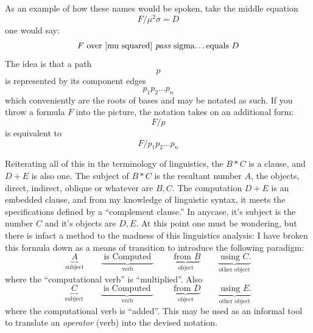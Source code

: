 \documentclass[twoside]{article}
\begin{document}
As an example of how these names would be spoken, take the middle equation
$$ F/\mu^{2}\sigma = D $$
one would say:
$$ F \mbox{ over [mu squared] \emph{pass} sigma\ldots equals } D $$
The idea is that a path
$$ p $$ is represented by its component edges
$$ p_1p_2\ldots p_n $$
which conveniently are the roots of bases and may be notated as such.
If you throw a formula $ F $ into the picture, the notation takes on an additional form:
$$ F/p $$
is equivalent to
$$ F/p_1p_2\ldots p_n $$

Reiterating all of this in the terminology of linguistics, the $ B*C $ is a clause, and $ D+E $ is also one.
The subject of $ B*C $ is the resultant number $ A $, the objects, direct, indirect, oblique or whatever are $ B, C $.
The computation $ D+E $ is an embedded clause, and from my knowledge of linguistic syntax, it meets the specifications
defined by a ``complement clause.''  In anycase, it's subject is the number $ C $ and it's objects are $ D, E $.  At this
point one must be wondering, but there is infact a method to the madness of this linguistics analysis:  I have broken this
formula down as a means of transition to introduce the following paradigm:
\begin{equation}
\underbrace{A}_{\mbox{subject}}\qquad \underbrace{\mbox{ is Computed }}_{\mbox{verb}}\qquad \underbrace{\mbox{ from } B}_{\mbox{object}}\qquad \underbrace{\mbox{ using } C\mbox{.}}_{\mbox{other object}}
\end{equation}
where the ``computational verb'' is ``multiplied''.  Also
\begin{equation}
\underbrace{C}_{\mbox{subject}}\qquad \underbrace{\mbox{ is Computed }}_{\mbox{verb}}\qquad \underbrace{\mbox{ from } D}_{\mbox{object}}\qquad \underbrace{\mbox{ using } E\mbox{.}}_{\mbox{other object}}
\end{equation}
where the computational verb is ``added''.  This may be used as an informal tool to translate an \emph{operator} (verb)
into the devised notation.
\end{document}

